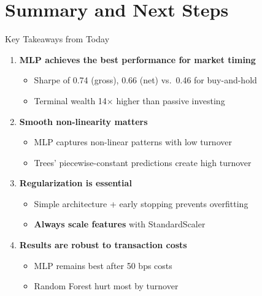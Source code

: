 \documentclass[10pt]{beamer}
\newcommand{\highlight}[1]{\textcolor{AccentOrange}{\textbf{#1}}}
\begin{document}
\section{Summary and Next Steps}

\begin{frame}{Key Takeaways from Today}

  \begin{enumerate}
    \item \textbf{MLP achieves the best performance for market timing}
    \begin{itemize}
      \item Sharpe of 0.74 (gross), 0.66 (net) vs.\ 0.46 for buy-and-hold
      \item Terminal wealth 14$\times$ higher than passive investing
    \end{itemize}

    \vspace{0.3em}
    \item \textbf{Smooth non-linearity matters}
    \begin{itemize}
      \item MLP captures non-linear patterns with low turnover
      \item Trees' piecewise-constant predictions create high turnover
    \end{itemize}

    \vspace{0.3em}
    \item \textbf{Regularization is essential}
    \begin{itemize}
      \item Simple architecture + early stopping prevents overfitting
      \item \highlight{Always scale features} with StandardScaler
    \end{itemize}

    \vspace{0.3em}
    \item \textbf{Results are robust to transaction costs}
    \begin{itemize}
      \item MLP remains best after 50 bps costs
      \item Random Forest hurt most by turnover
    \end{itemize}
  \end{enumerate}
\end{frame}
\end{document}
